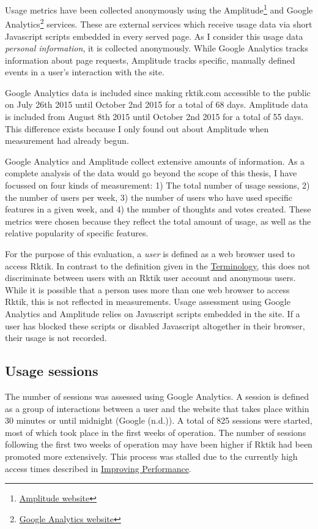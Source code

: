 Usage metrics have been collected anonymously using the
Amplitude\footnote{\href{https://amplitude.com/}{Amplitude website}} and
Google Analytics\footnote{\href{https://www.google.com/analytics/}{Google
  Analytics website}} services. These are external services which
receive usage data via short Javascript scripts embedded in every served
page. As I consider this usage data \emph{personal information}, it is
collected anonymously. While Google Analytics tracks information about
page requests, Amplitude tracks specific, manually defined events in a
user's interaction with the site.

Google Analytics data is included since making rktik.com accessible to
the public on July 26th 2015 until October 2nd 2015 for a total of 68
days. Amplitude data is included from August 8th 2015 until October 2nd
2015 for a total of 55 days. This difference exists because I only found
out about Amplitude when measurement had already begun.

Google Analytics and Amplitude collect extensive amounts of information.
As a complete analysis of the data would go beyond the scope of this
thesis, I have focussed on four kinds of measurement: 1) The total
number of usage sessions, 2) the number of users per week, 3) the number
of users who have used specific features in a given week, and 4) the
number of thoughts and votes created. These metrics were chosen because
they reflect the total amount of usage, as well as the relative
popularity of specific features.

For the purpose of this evaluation, a \emph{user} is defined as a web
browser used to access Rktik. In contrast to the definition given in the
\hyperref[terminology]{Terminology}, this does not discriminate between
users with an Rktik user account and anonymous users. While it is
possible that a person uses more than one web browser to access Rktik,
this is not reflected in measurements. Usage assessment using Google
Analytics and Amplitude relies on Javascript scripts embedded in the
site. If a user has blocked these scripts or disabled Javascript
altogether in their browser, their usage is not recorded.

\subsection{Usage sessions}\label{usage-sessions}

The number of sessions was assessed using Google Analytics. A session is
defined as a group of interactions between a user and the website that
takes place within 30 minutes or until midnight (Google (n.d.)). A total
of 825 sessions were started, most of which took place in the first
weeks of operation. The number of sessions following the first two weeks
of operation may have been higher if Rktik had been promoted more
extensively. This process was stalled due to the currently high access
times described in \hyperref[improving-performance]{Improving
Performance}.

